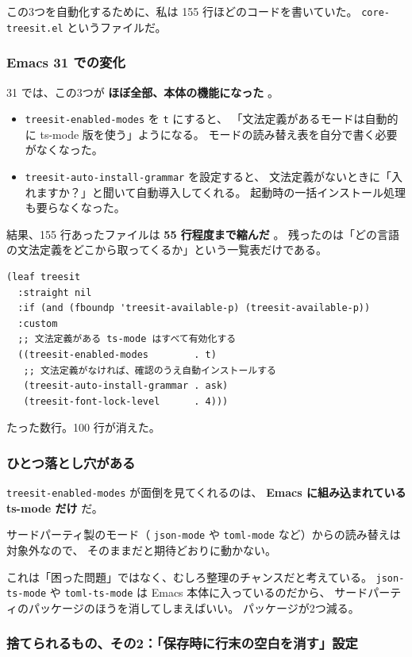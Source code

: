 \documentclass[11pt]{article}
\begin{document}
この3つを自動化するために、私は 155 行ほどのコードを書いていた。
\texttt{core-treesit.el} というファイルだ。
\subsubsection{Emacs 31 での変化}
\label{sec:org84e443e}

31 では、この3つが \textbf{ほぼ全部、本体の機能になった} 。

\begin{itemize}
\item \texttt{treesit-enabled-modes} を \texttt{t} にすると、
「文法定義があるモードは自動的に ts-mode 版を使う」ようになる。
モードの読み替え表を自分で書く必要がなくなった。
\item \texttt{treesit-auto-install-grammar} を設定すると、
文法定義がないときに「入れますか？」と聞いて自動導入してくれる。
起動時の一括インストール処理も要らなくなった。
\end{itemize}

結果、155 行あったファイルは \textbf{55 行程度まで縮んだ} 。
残ったのは「どの言語の文法定義をどこから取ってくるか」という一覧表だけである。

\begin{verbatim}
(leaf treesit
  :straight nil
  :if (and (fboundp 'treesit-available-p) (treesit-available-p))
  :custom
  ;; 文法定義がある ts-mode はすべて有効化する
  ((treesit-enabled-modes        . t)
   ;; 文法定義がなければ、確認のうえ自動インストールする
   (treesit-auto-install-grammar . ask)
   (treesit-font-lock-level      . 4)))
\end{verbatim}

たった数行。100 行が消えた。
\subsubsection{ひとつ落とし穴がある}
\label{sec:org62ce095}

\texttt{treesit-enabled-modes} が面倒を見てくれるのは、
\textbf{Emacs に組み込まれている ts-mode だけ} だ。

サードパーティ製のモード（ \texttt{json-mode} や \texttt{toml-mode} など）からの読み替えは対象外なので、
そのままだと期待どおりに動かない。

これは「困った問題」ではなく、むしろ整理のチャンスだと考えている。
\texttt{json-ts-mode} や \texttt{toml-ts-mode} は Emacs 本体に入っているのだから、
サードパーティのパッケージのほうを消してしまえばいい。
パッケージが2つ減る。
\subsubsection{捨てられるもの、その2：「保存時に行末の空白を消す」設定}
\label{sec:org07fe3cd}
\end{document}
